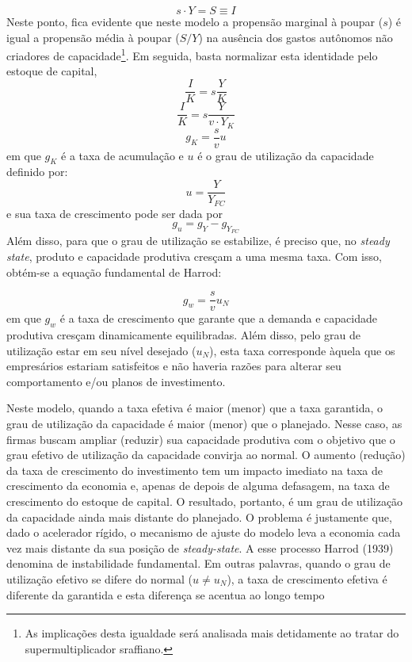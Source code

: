 $$
s\cdot Y = S \equiv I
$$
Neste ponto, fica evidente que neste modelo a propensão marginal à poupar ($s$) é igual a propensão média à poupar ($S/Y$) na ausência dos gastos autônomos não criadores de capacidade\footnote{As implicações desta igualdade será analisada mais detidamente ao tratar do supermultiplicador sraffiano.}. Em seguida, basta normalizar esta identidade pelo estoque de capital,
$$
\frac{I}{K} = s\frac{Y}{K}
$$
$$
\frac{I}{K} = s\frac{Y}{v\cdot Y_K}
$$
\begin{equation}
    g_K = \frac{s}{v}u
\end{equation}
em que $g_K$ é a taxa de acumulação e $u$ é o grau de utilização da capacidade definido por:
$$
u = \frac{Y}{Y_{FC}}
$$
e sua taxa de crescimento pode ser dada por
$$
g_u = g_Y - g_{Y_{FC}}
$$
Além disso, para que o grau de utilização se estabilize, é preciso que, no \textit{steady state}, produto e capacidade produtiva cresçam a uma mesma taxa. Com isso, obtém-se a equação fundamental de Harrod:

\begin{equation}
    \label{Fundamental}
    g_w = \frac{s}{v}u_N
\end{equation}
em que $g_w$ é a taxa de crescimento que garante que a demanda e capacidade produtiva cresçam dinamicamente equilibradas. Além disso, pelo grau de utilização estar em seu nível desejado ($u_N$), esta taxa corresponde àquela que os empresários estariam satisfeitos e não haveria razões para alterar seu comportamento e/ou planos de investimento. 

Neste modelo, quando a taxa efetiva é maior (menor) que a taxa garantida, o grau de utilização da capacidade é maior (menor) que o planejado. Nesse caso, as firmas buscam ampliar (reduzir) sua capacidade produtiva com o objetivo que o grau efetivo de utilização da capacidade convirja ao normal. O aumento (redução) da taxa de crescimento do investimento tem um impacto imediato na taxa de crescimento da
economia e, apenas de depois de alguma defasagem, na taxa de crescimento do estoque de capital. O resultado, portanto, é um grau de utilização da capacidade ainda mais distante do planejado. O problema é justamente que, dado o acelerador rígido, o mecanismo de ajuste do modelo leva a economia cada vez mais distante da sua posição de \textit{steady-state}. A esse processo Harrod (1939) denomina de instabilidade fundamental. Em outras palavras, quando o grau de utilização efetivo se difere do normal ($u\neq u_N$),  a taxa de crescimento efetiva é diferente da garantida e esta diferença se acentua ao longo tempo


